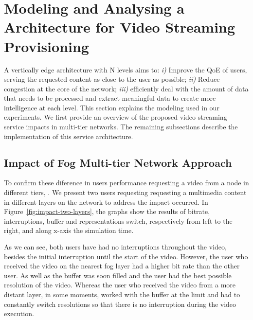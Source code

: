 \section{Modeling and Analysing a Architecture for Video Streaming Provisioning}
\label{sec:system-archi}


A vertically edge architecture with N levels aims to: \textit{i)} Improve the QoE of users, serving the requested content as close to the user as possible; \textit{ii)} Reduce congestion at the core of the network; \textit{iii)} efficiently deal with the amount of data that needs to be processed and extract meaningful data to create more intelligence at each level. This section explains the modeling used in our experiments. We first provide an overview of the proposed video streaming service impacts in multi-tier networks. The remaining subsections describe the implementation of this service architecture.

\subsection{Impact of Fog Multi-tier Network Approach}

To confirm these diference in users performance requesting a video from a node in different tiers, . We present two users requesting requesting a multimedia content in different layers on the network to address the impact occurred. In Figure~\ref{fig:impact-two-layers}, the graphs show the results of bitrate, interruptions, buffer and representations switch, respectively from left to the right, and along x-axis the simulation time. 

As we can see, both users have had no interruptions throughout the video, besides the initial interruption until the start of the video. However, the user who received the video on the nearest fog layer had a higher bit rate than the other user. As well as the buffer was soon filled and the user had the best possible resolution of the video. Whereas the user who received the video from a more distant layer, in some moments, worked with the buffer at the limit and had to constantly switch resolutions so that there is no interruption during the video execution.


